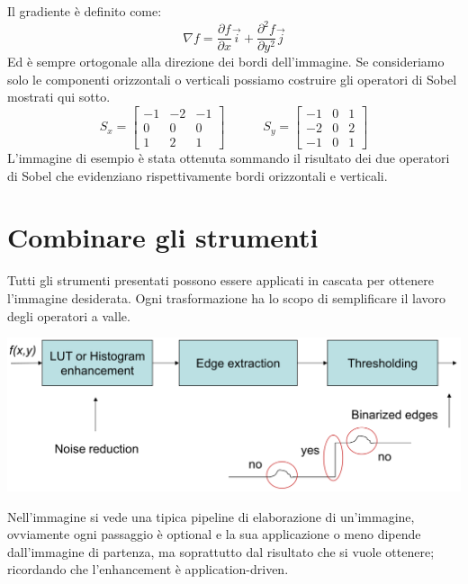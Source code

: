 Il gradiente è definito come:
\begin{equation}
	\nabla f = \frac{\partial f}{\partial x} \vec{i} +  \frac{\partial^2 f}{\partial y^2} \vec{j}
\end{equation}
Ed è sempre ortogonale alla direzione dei bordi dell'immagine. Se consideriamo solo le componenti orizzontali o verticali possiamo costruire gli operatori di Sobel mostrati qui sotto.
\begin{equation}
	S_x = 
	\begin{bmatrix}
		-1 & -2 & -1 \\
		0 & 0 & 0 \\
		1 & 2 & 1 
	\end{bmatrix}
	\quad \quad \quad
	S_y = 
	\begin{bmatrix}
		-1 & 0 & 1 \\
		-2 & 0 & 2\\
		-1 & 0 & 1 
	\end{bmatrix}
\end{equation}
L'immagine di esempio è stata ottenuta sommando il risultato dei due operatori di Sobel che evidenziano rispettivamente bordi orizzontali e verticali.

\section{Combinare gli strumenti}
Tutti gli strumenti presentati possono essere applicati in cascata per ottenere l'immagine desiderata. Ogni trasformazione ha lo scopo di semplificare il lavoro degli operatori a valle.
\begin{center}
	\includegraphics[width=.9\linewidth]{Picture/Enhancement_Pipeline}
\end{center}
Nell'immagine si vede una tipica pipeline di elaborazione di un'immagine, ovviamente ogni passaggio è optional e la sua applicazione o meno dipende dall'immagine di partenza, ma soprattutto dal risultato che si vuole ottenere; ricordando che l'enhancement è application-driven.